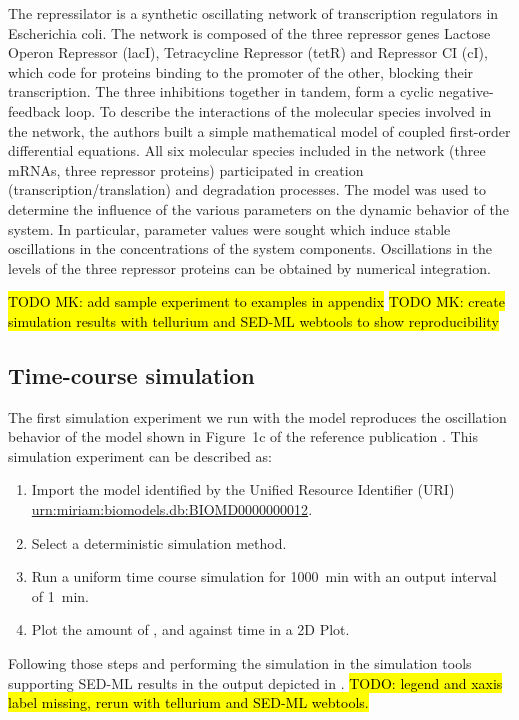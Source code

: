 The repressilator is a synthetic oscillating network of transcription regulators in Escherichia coli. The network is composed of the three repressor genes Lactose Operon Repressor (lacI), Tetracycline Repressor (tetR) and Repressor CI (cI), which code for proteins binding to the promoter of the other, blocking their transcription. The three inhibitions together in tandem, form a cyclic negative-feedback loop. To describe the interactions of the molecular species involved in the network, the authors built a simple mathematical model of coupled first-order differential equations. All six molecular species included in the network (three mRNAs, three repressor proteins) participated in creation (transcription/translation) and degradation processes. The model was used to determine the influence of the various parameters on the dynamic behavior of the system. In particular, parameter values were sought which induce stable oscillations in the concentrations of the system components. Oscillations in the levels of the three repressor proteins can be obtained by numerical integration. 

\hl{TODO MK: add sample experiment to examples in appendix}
\hl{TODO MK: create simulation results with tellurium and SED-ML webtools to show reproducibility}

\subsection{Time-course simulation}
\label{sec:timecourse}
The first simulation experiment we run with the model reproduces the oscillation behavior of the model shown in Figure~1c of the reference publication \citep{Elowitz:2000}. This simulation experiment can be described as:

\begin{enumerate}
 	\item{Import the model identified by the Unified Resource Identifier (URI) \citep{Berners-Lee:2005}\\ 	\url{urn:miriam:biomodels.db:BIOMD0000000012}.}
 	\item {Select a deterministic simulation method.}
 	\item{Run a uniform time course simulation for 1000~min with an output interval of 1~min.}
 	\item{Plot the amount of ,  and  against time in a 2D Plot.}
 \end{enumerate}

Following those steps and performing the simulation in the simulation tools supporting SED-ML results in the output depicted in . \hl{TODO: legend and xaxis label missing, rerun with tellurium and SED-ML webtools.}

